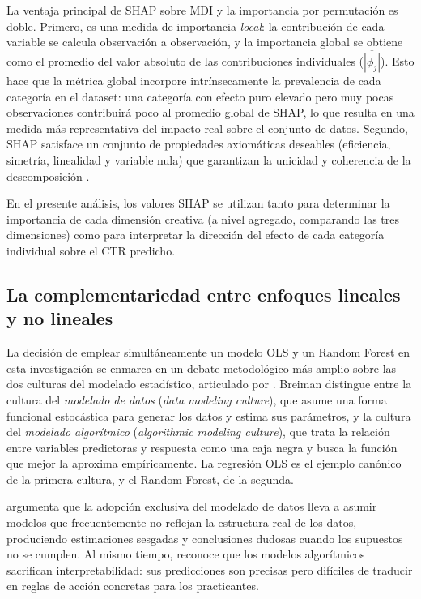 \documentclass[12pt, a4paper]{report}
\begin{document}
La ventaja principal de SHAP sobre MDI y la importancia por permutación es doble.
Primero, es una medida de importancia \textit{local}: la contribución de cada
variable se calcula observación a observación, y la importancia global se obtiene
como el promedio del valor absoluto de las contribuciones individuales
($\overline{|\phi_j|}$). Esto hace que la métrica global incorpore intrínsecamente
la prevalencia de cada categoría en el dataset: una categoría con efecto puro elevado
pero muy pocas observaciones contribuirá poco al promedio global de SHAP, lo que
resulta en una medida más representativa del impacto real sobre el conjunto de datos.
Segundo, SHAP satisface un conjunto de propiedades axiomáticas deseables (eficiencia,
simetría, linealidad y variable nula) que garantizan la unicidad y coherencia de
la descomposición \citep{lundberg2017}.

En el presente análisis, los valores SHAP se utilizan tanto para determinar la
importancia de cada dimensión creativa (a nivel agregado, comparando las tres
dimensiones) como para interpretar la dirección del efecto de cada categoría
individual sobre el CTR predicho.

\subsection{La complementariedad entre enfoques lineales y no lineales}

La decisión de emplear simultáneamente un modelo OLS y un Random Forest en esta
investigación se enmarca en un debate metodológico más amplio sobre las dos culturas
del modelado estadístico, articulado por \citet{breiman2001b}. Breiman distingue entre
la cultura del \textit{modelado de datos} (\textit{data modeling culture}), que asume
una forma funcional estocástica para generar los datos y estima sus parámetros, y la
cultura del \textit{modelado algorítmico} (\textit{algorithmic modeling culture}), que
trata la relación entre variables predictoras y respuesta como una caja negra y busca
la función que mejor la aproxima empíricamente. La regresión OLS es el ejemplo canónico
de la primera cultura, y el Random Forest, de la segunda.

\citet{breiman2001b} argumenta que la adopción exclusiva del modelado de datos lleva a
asumir modelos que frecuentemente no reflejan la estructura real de los datos, produciendo
estimaciones sesgadas y conclusiones dudosas cuando los supuestos no se cumplen. Al mismo
tiempo, reconoce que los modelos algorítmicos sacrifican interpretabilidad: sus predicciones
son precisas pero difíciles de traducir en reglas de acción concretas para los practicantes.
\end{document}
